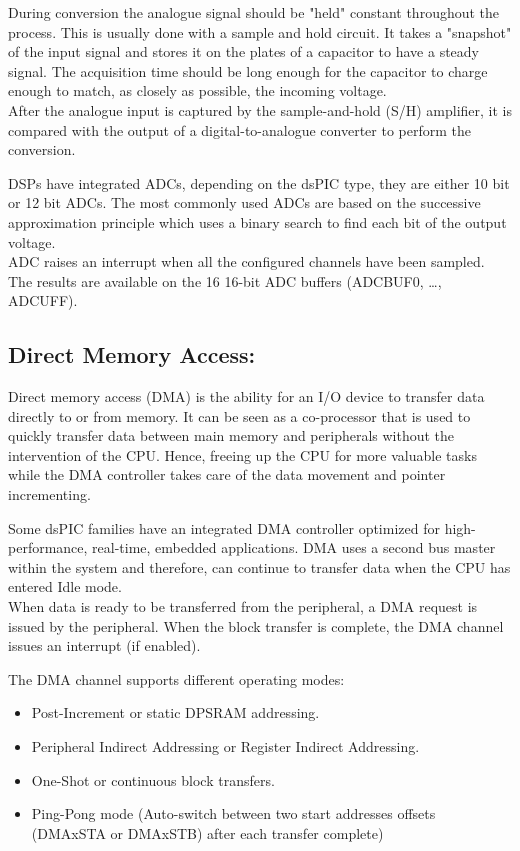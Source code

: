 During conversion the analogue signal should be "held" constant throughout the process. This is usually done with a sample and hold circuit. It takes a "snapshot" of the input signal and stores it on the plates of a capacitor to have a steady signal. The acquisition time should be long enough for the capacitor to charge enough to match, as closely as possible, the incoming voltage.\\
After the analogue input is captured by the sample-and-hold (S/H) amplifier, it is compared with the output of a digital-to-analogue converter to perform the conversion. 

DSPs have integrated ADCs, depending on the dsPIC type, they are either 10 bit or 12 bit ADCs.  The most commonly used ADCs are based on the successive approximation principle which uses a binary search to find each bit of the output voltage.\\
ADC raises an interrupt when all the configured channels have been sampled. The results are available on the 16 16-bit ADC buffers (ADCBUF0, …, ADCUFF).


\subsection{Direct Memory Access:}

Direct memory access (DMA) is the ability for an I/O device to transfer data directly to or from memory.  It can be seen as a co-processor that is used to quickly transfer data between main memory and peripherals without the intervention of the CPU. Hence, freeing up the CPU for more valuable tasks while the DMA controller takes care of the data movement and pointer incrementing.

Some dsPIC families have an integrated DMA controller optimized for high-performance, real-time, embedded applications. DMA uses a second bus master within the system and therefore, can continue to transfer data when the CPU has entered Idle mode.\\
When data is ready to be transferred from the peripheral, a DMA request is issued by the peripheral. When the block transfer is complete, the DMA channel issues an interrupt (if enabled).

The DMA channel supports different operating modes:
\begin{itemize}
    \item Post-Increment or static DPSRAM addressing.
    \item Peripheral Indirect Addressing or Register Indirect Addressing.
    \item One-Shot or continuous block transfers.
    \item Ping-Pong mode (Auto-switch between two start addresses offsets (DMAxSTA or DMAxSTB) after each transfer complete)
\end{itemize}




